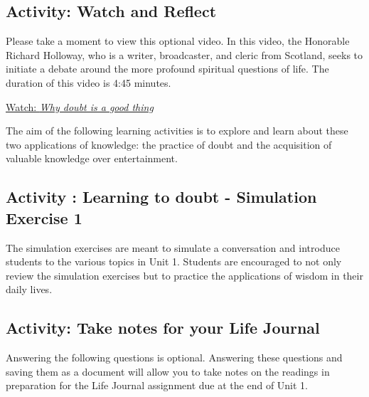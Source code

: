 \documentclass[
]{book}
\begin{document}
\hypertarget{activity-watch-and-reflect-1}{%
\subsection*{Activity: Watch and Reflect}\label{activity-watch-and-reflect-1}}

\begin{reflect}
Please take a moment to view this optional video. In this video, the Honorable Richard Holloway, who is a writer, broadcaster, and cleric from Scotland, seeks to initiate a debate around the more profound spiritual questions of life. The duration of this video is 4:45 minutes.

\href{https://www.youtube.com/watch?v=LERi_Xjfio4}{Watch: \emph{Why doubt is a good thing}}
\end{reflect}

The aim of the following learning activities is to explore and learn about these two applications of knowledge: the practice of doubt and the acquisition of valuable knowledge over entertainment.

\hypertarget{activity-learning-to-doubt---simulation-exercise-1}{%
\subsection*{Activity : Learning to doubt - Simulation Exercise 1}\label{activity-learning-to-doubt---simulation-exercise-1}}

\begin{reflect}
The simulation exercises are meant to simulate a conversation and introduce students to the various topics in Unit 1. Students are encouraged to not only review the simulation exercises but to practice the applications of wisdom in their daily lives.
\end{reflect}

\hypertarget{activity-take-notes-for-your-life-journal-1}{%
\subsection*{Activity: Take notes for your Life Journal}\label{activity-take-notes-for-your-life-journal-1}}

\begin{reflect}
Answering the following questions is optional. Answering these questions and saving them as a document will allow you to take notes on the readings in preparation for the Life Journal assignment due at the end of Unit 1.
\end{reflect}
\end{document}
